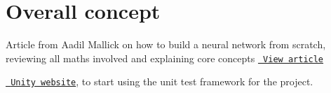 \chapter{Overall concept}
\hypertarget{md_project__ressources_2bibliography}{}\label{md_project__ressources_2bibliography}
\label{md_project__ressources_2bibliography_autotoc_md16}%
%

\begin{DoxyItemize}
\item Article from Aadil Mallick on how to build a neural network from scratch, reviewing all maths involved and explaining core concepts \href{https://blog.stackademic.com/learn-to-build-a-neural-network-from-scratch-yes-really-cac4ca457efc}{\texttt{ View article}}
\item \href{https://www.throwtheswitch.org/unity}{\texttt{ Unity website}}, to start using the unit test framework for the project. 
\end{DoxyItemize}